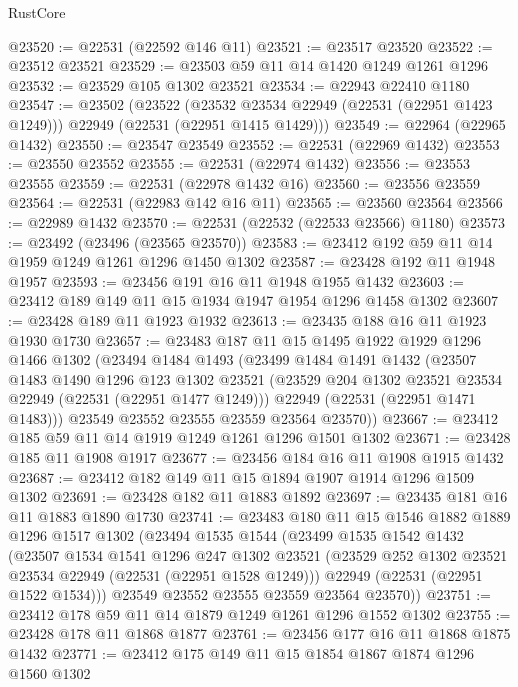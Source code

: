 \begin{lexlean}{RustCore}
\begin{coremodule}
@23520 := @22531 (@22592 @146 @11)
@23521 := @23517 @23520
@23522 := @23512 @23521
@23529 := @23503 @59 @11 @14 @1420 @1249 @1261 @1296
@23532 := @23529 @105 @1302 @23521
@23534 := @22943 @22410 @1180
@23547 := @23502
    (@23522
      (@23532 @23534 @22949 (@22531 (@22951 @1423 @1249)))
      @22949
      (@22531 (@22951 @1415 @1429)))
@23549 := @22964 (@22965 @1432)
@23550 := @23547 @23549
@23552 := @22531 (@22969 @1432)
@23553 := @23550 @23552
@23555 := @22531 (@22974 @1432)
@23556 := @23553 @23555
@23559 := @22531 (@22978 @1432 @16)
@23560 := @23556 @23559
@23564 := @22531 (@22983 @142 @16 @11)
@23565 := @23560 @23564
@23566 := @22989 @1432
@23570 := @22531 (@22532 (@22533 @23566) @1180)
@23573 := @23492 (@23496 (@23565 @23570))
@23583 := @23412 @192 @59 @11 @14 @1959 @1249 @1261 @1296 @1450 @1302
@23587 := @23428 @192 @11 @1948 @1957
@23593 := @23456 @191 @16 @11 @1948 @1955 @1432
@23603 := @23412 @189 @149 @11 @15 @1934 @1947 @1954 @1296 @1458 @1302
@23607 := @23428 @189 @11 @1923 @1932
@23613 := @23435 @188 @16 @11 @1923 @1930 @1730
@23657 := @23483
    @187
    @11
    @15
    @1495
    @1922
    @1929
    @1296
    @1466
    @1302
    (@23494
      @1484
      @1493
      (@23499
        @1484
        @1491
        @1432
        (@23507
          @1483
          @1490
          @1296
          @123
          @1302
          @23521
          (@23529 @204 @1302 @23521 @23534 @22949 (@22531 (@22951 @1477 @1249)))
          @22949
          (@22531 (@22951 @1471 @1483)))
        @23549
        @23552
        @23555
        @23559
        @23564
        @23570))
@23667 := @23412 @185 @59 @11 @14 @1919 @1249 @1261 @1296 @1501 @1302
@23671 := @23428 @185 @11 @1908 @1917
@23677 := @23456 @184 @16 @11 @1908 @1915 @1432
@23687 := @23412 @182 @149 @11 @15 @1894 @1907 @1914 @1296 @1509 @1302
@23691 := @23428 @182 @11 @1883 @1892
@23697 := @23435 @181 @16 @11 @1883 @1890 @1730
@23741 := @23483
    @180
    @11
    @15
    @1546
    @1882
    @1889
    @1296
    @1517
    @1302
    (@23494
      @1535
      @1544
      (@23499
        @1535
        @1542
        @1432
        (@23507
          @1534
          @1541
          @1296
          @247
          @1302
          @23521
          (@23529 @252 @1302 @23521 @23534 @22949 (@22531 (@22951 @1528 @1249)))
          @22949
          (@22531 (@22951 @1522 @1534)))
        @23549
        @23552
        @23555
        @23559
        @23564
        @23570))
@23751 := @23412 @178 @59 @11 @14 @1879 @1249 @1261 @1296 @1552 @1302
@23755 := @23428 @178 @11 @1868 @1877
@23761 := @23456 @177 @16 @11 @1868 @1875 @1432
@23771 := @23412 @175 @149 @11 @15 @1854 @1867 @1874 @1296 @1560 @1302

\end{coremodule}
\end{lexlean}
